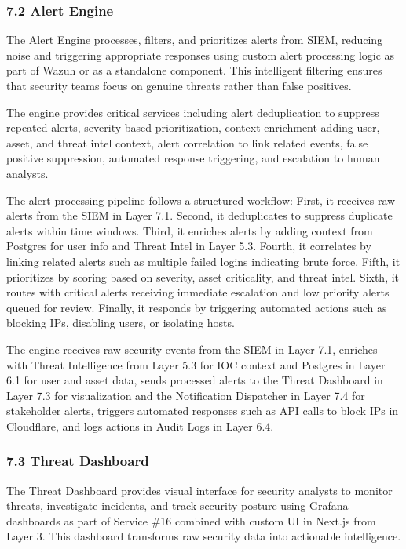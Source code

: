 \documentclass[12pt,a4paper]{report}
\begin{document}
\subsubsection{7.2 Alert Engine}

The Alert Engine processes, filters, and prioritizes alerts from SIEM, reducing noise and triggering appropriate responses using custom alert processing logic as part of Wazuh or as a standalone component. This intelligent filtering ensures that security teams focus on genuine threats rather than false positives.

The engine provides critical services including alert deduplication to suppress repeated alerts, severity-based prioritization, context enrichment adding user, asset, and threat intel context, alert correlation to link related events, false positive suppression, automated response triggering, and escalation to human analysts.

The alert processing pipeline follows a structured workflow: First, it receives raw alerts from the SIEM in Layer 7.1. Second, it deduplicates to suppress duplicate alerts within time windows. Third, it enriches alerts by adding context from Postgres for user info and Threat Intel in Layer 5.3. Fourth, it correlates by linking related alerts such as multiple failed logins indicating brute force. Fifth, it prioritizes by scoring based on severity, asset criticality, and threat intel. Sixth, it routes with critical alerts receiving immediate escalation and low priority alerts queued for review. Finally, it responds by triggering automated actions such as blocking IPs, disabling users, or isolating hosts.

The engine receives raw security events from the SIEM in Layer 7.1, enriches with Threat Intelligence from Layer 5.3 for IOC context and Postgres in Layer 6.1 for user and asset data, sends processed alerts to the Threat Dashboard in Layer 7.3 for visualization and the Notification Dispatcher in Layer 7.4 for stakeholder alerts, triggers automated responses such as API calls to block IPs in Cloudflare, and logs actions in Audit Logs in Layer 6.4.

\subsubsection{7.3 Threat Dashboard}

The Threat Dashboard provides visual interface for security analysts to monitor threats, investigate incidents, and track security posture using Grafana dashboards as part of Service \#16 combined with custom UI in Next.js from Layer 3. This dashboard transforms raw security data into actionable intelligence.
\end{document}
